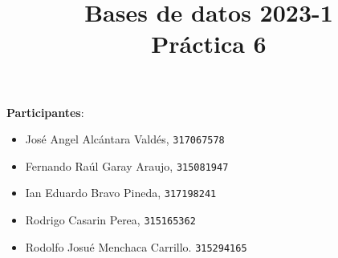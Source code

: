 \documentclass[12pt,letterpaper]{article}
\title{Bases de datos 2023-1\\
Práctica 6}
\begin{document}
\maketitle

\textbf{Participantes}:
\begin{itemize}
	\item José Angel Alcántara Valdés, \texttt{317067578}\\
	\item Fernando Raúl Garay Araujo, \texttt{315081947}\\
	\item Ian Eduardo Bravo Pineda, \texttt{317198241}\\
	\item Rodrigo Casarin Perea, \texttt{315165362}\\
	\item Rodolfo Josué Menchaca Carrillo. \texttt{315294165}\\
\end{itemize}
\end{document}
